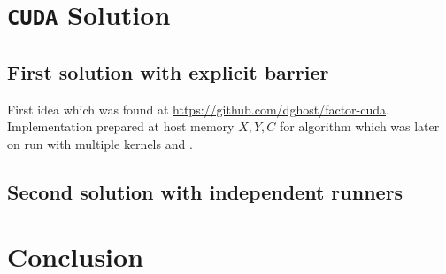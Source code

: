 \documentclass[a4paper]{article}
\begin{document}
\section{\texttt{CUDA} Solution}


\subsection{First solution with explicit barrier}

First idea which was found at \url{https://github.com/dghost/factor-cuda}. Implementation prepared at host memory $X, Y, C$ for algorithm which was later on run with multiple kernels and .

\subsection{Second solution with independent runners}


\section{Conclusion}





\appendix
\end{document}
